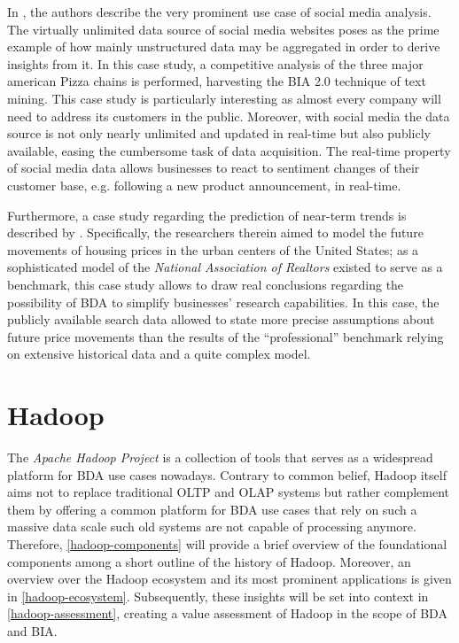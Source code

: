 In \textcite{he2013social}, the authors describe the very prominent use case of social media analysis. The virtually unlimited data source of social media websites poses as the prime example of how mainly unstructured data may be aggregated in order to derive insights from it. In this case study, a competitive analysis of the three major american Pizza chains is performed, harvesting the \ac{BIA} 2.0 technique of text mining. This case study is particularly interesting as almost every company will need to address its customers in the public. Moreover, with social media the data source is not only nearly unlimited and updated in real-time but also publicly available, easing the cumbersome task of data acquisition. The real-time property of social media data allows businesses to react to sentiment changes of their customer base, e.g. following a new product announcement, in real-time.

Furthermore, a case study regarding the prediction of near-term trends is described by \textcite[p.~64]{mcafeebig}. Specifically, the researchers therein aimed to model the future movements of housing prices in the urban centers of the United States; as a sophisticated model of the \emph{National Association of Realtors} existed to serve as a benchmark, this case study allows to draw real conclusions regarding the possibility of \ac{BDA} to simplify businesses' research capabilities. In this case, the publicly available search data allowed to state more precise assumptions about future price movements than the results of the \enquote{professional} benchmark relying on extensive historical data and a quite complex model.


\section{Hadoop}
\label{sota-hadoop}

The \emph{Apache Hadoop Project} is a collection of tools that serves as a widespread platform for \ac{BDA} use cases nowadays. Contrary to common belief, Hadoop itself aims not to replace traditional \ac{OLTP} and \ac{OLAP} systems but rather complement them by offering a common platform for \ac{BDA} use cases that rely on such a massive data scale such old systems are not capable of processing anymore. Therefore, \autoref{hadoop-components} will provide a brief overview of the foundational components among a short outline of the history of Hadoop. Moreover, an overview over the Hadoop ecosystem and its most prominent applications is given in \autoref{hadoop-ecosystem}.
Subsequently, these insights will be set into context in \autoref{hadoop-assessment}, creating a value assessment of Hadoop in the scope of \ac{BDA} and \ac{BIA}.

